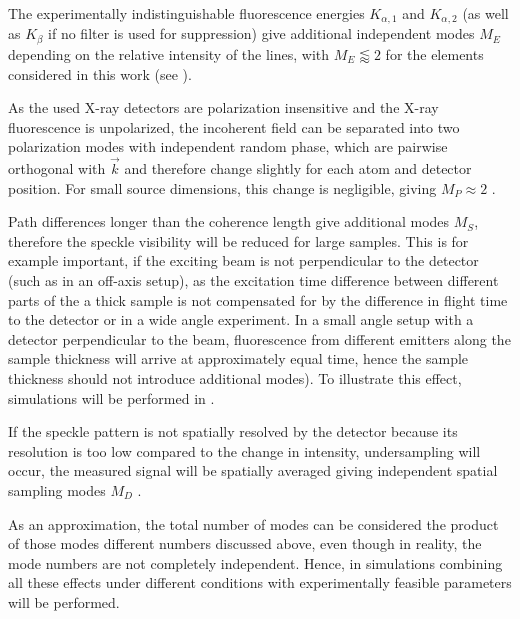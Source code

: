 The experimentally indistinguishable fluorescence energies $K_{\alpha,1}$ and $K_{\alpha,2}$ (as well as  $K_\beta$ if no filter is used for suppression) give additional independent modes $M_E$ depending on the relative intensity of the lines, with $M_E \lessapprox 2$ for the elements considered in this work (see ).

As the used X-ray detectors are polarization insensitive and the X-ray fluorescence is unpolarized, the incoherent field can be separated into two polarization modes with independent random phase, which are pairwise orthogonal with $\vec{k}$ and therefore change slightly for each atom and detector position. For small source dimensions, this change is negligible,  giving $M_P \approx 2$ \cite{classen2019}. 

Path differences longer than the coherence length give additional modes $M_S$, therefore the speckle visibility will be reduced for large samples. This is for example important, if the exciting beam is not perpendicular to the detector (such as in an off-axis setup), as the excitation time difference between different parts of the a thick sample is not compensated for by the difference in flight time to the detector or in a wide angle experiment. In a small angle setup with a detector perpendicular to the beam, fluorescence from different emitters along the sample thickness will arrive at approximately equal time, hence the sample thickness should not introduce additional modes). To illustrate this effect, simulations will be performed in .

If the speckle pattern is not spatially resolved by the detector because its resolution is too low compared to the change in intensity, undersampling will occur, the measured signal will be spatially averaged giving independent spatial sampling modes $M_D$ \cite{goodman2007}.

As an approximation, the total number of modes can be considered the product of those modes different numbers discussed above, even though in reality, the mode numbers are not completely independent.
Hence, in  simulations combining all these effects under different conditions with experimentally feasible  parameters will be performed.


